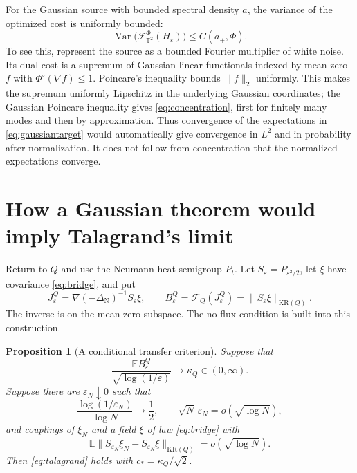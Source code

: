 \documentclass[11pt]{article}
\newtheorem{proposition}{Proposition}[section]
\theoremstyle{definition}
\newcommand{\E}{\mathbb E}
\newcommand{\T}{\mathbb T}
\newcommand{\Var}{\operatorname{Var}}
\newcommand{\KR}{\mathrm{KR}}
\newcommand{\cF}{\mathcal F}
\begin{document}
For the Gaussian source with bounded spectral density $a$, the variance
of the optimized cost is uniformly bounded:
\begin{equation}\label{eq:concentration}
  \Var\bigl(\cF_{\T^2}^\Phi(H_\varepsilon)\bigr)\leq C(a_+,\Phi).
\end{equation}
To see this, represent the source as a bounded Fourier multiplier of
white noise. Its dual cost is a supremum of Gaussian linear functionals
indexed by mean-zero $f$ with $\Phi^\circ(\nabla f)\leq1$.
Poincare's inequality bounds $\|f\|_2$ uniformly. This makes the
supremum uniformly Lipschitz in the underlying Gaussian coordinates;
the Gaussian Poincare inequality gives \eqref{eq:concentration}, first
for finitely many modes and then by approximation. Thus convergence of
the expectations in \eqref{eq:gaussiantarget} would automatically give
convergence in $L^2$ and in probability after normalization. It does not
follow from concentration that the normalized expectations converge.

\section{How a Gaussian theorem would imply Talagrand's limit}
\label{sec:transfer}

Return to $Q$ and use the Neumann heat semigroup $P_t$. Let
$S_\varepsilon=P_{\varepsilon^2/2}$, let $\xi$ have covariance
\eqref{eq:bridge}, and put
\[
  J_\varepsilon^Q
  =\nabla(-\Delta_{\mathrm N})^{-1}S_\varepsilon\xi,
  \qquad
  B_\varepsilon^Q
  =\cF_Q(J_\varepsilon^Q)
  =\|S_\varepsilon\xi\|_{\KR(Q)}.
\]
The inverse is on the mean-zero subspace. The no-flux condition is built
into this construction.

\begin{proposition}[A conditional transfer criterion]\label{prop:transfer}
Suppose that
\begin{equation}\label{eq:squarelimit}
  \frac{\E B_\varepsilon^Q}{\sqrt{\log(1/\varepsilon)}}
  \longrightarrow\kappa_Q\in(0,\infty).
\end{equation}
Suppose there are $\varepsilon_N\downarrow0$ such that
\begin{equation}\label{eq:scales}
  \frac{\log(1/\varepsilon_N)}{\log N}\longrightarrow\frac12,
  \qquad
  \sqrt N\,\varepsilon_N=o(\sqrt{\log N}),
\end{equation}
and couplings of $\xi_N$ and a field $\xi$ of law \eqref{eq:bridge} with
\begin{equation}\label{eq:couplingtarget}
  \E\|S_{\varepsilon_N}\xi_N-S_{\varepsilon_N}\xi\|_{\KR(Q)}
  =o(\sqrt{\log N}).
\end{equation}
Then \eqref{eq:talagrand} holds with $c_*=\kappa_Q/\sqrt2$.
\end{proposition}
\end{document}
